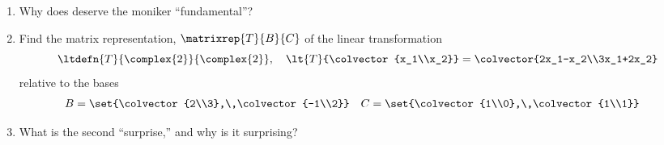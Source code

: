 \begin{enumerate}
%
\item Why does  deserve the moniker ``fundamental''?
%
\item Find the matrix representation, $\matrixrep{T}{B}{C}$ of the linear transformation
%
\begin{equation*}
\ltdefn{T}{\complex{2}}{\complex{2}},\quad\lt{T}{\colvector{x_1\\x_2}}=\colvector{2x_1-x_2\\3x_1+2x_2}
\end{equation*}
%
relative to the bases
%
\begin{align*}
B&=\set{\colvector{2\\3},\,\colvector{-1\\2}}&
C&=\set{\colvector{1\\0},\,\colvector{1\\1}}
\end{align*}
%
%
\item What is the second ``surprise,'' and why is it surprising?
%
\end{enumerate}